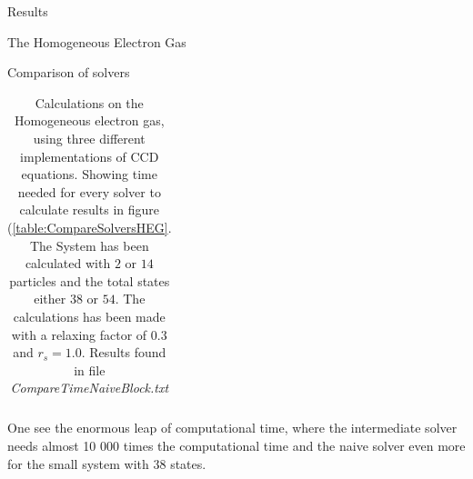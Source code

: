 \documentclass[twoside,english]{uiofysmaster}
\begin{document}
\begin{chapter}{Results}
\begin{section}{The Homogeneous Electron Gas}
\begin{subsection}{Comparison of solvers}
\begin{table}[H]
\begin{center}
\begin{tabular}[center]{l | c  c  c  r}
					\end{tabular}
				\end{center}
				\caption{Calculations on the Homogeneous electron gas, using three different implementations of CCD equations. Showing time needed for every solver to calculate results in figure (\ref{table:CompareSolversHEG}. The System has been calculated with $2$ or $14$ particles and the total states either $38$ or $54$. The calculations has been made with a relaxing factor of $0.3$ and $r_s = 1.0$. Results found in file \textit{CompareTimeNaiveBlock.txt} \cite{WholmenGithub}}
				\label{table:CompareSolversTimeHEG}
			\end{table}
			One see the enormous leap of computational time, where the intermediate solver needs almost 10 000 times the computational time and the naive solver even more for the small system with $38$ states. 
		\end{subsection}
 		

\end{section}
\end{chapter}
\end{document}
